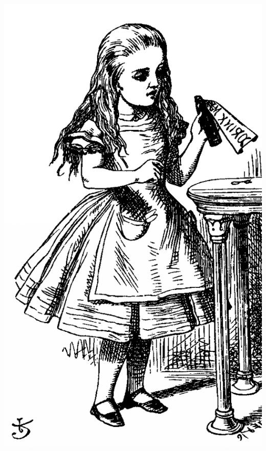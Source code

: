 \documentclass[12pt]{article}
\begin{document}
			\begin{minipage}{0.6\linewidth}
					\includegraphics[width=\linewidth]{3.png}
				\end{minipage}
				\hfill
\end{document}
